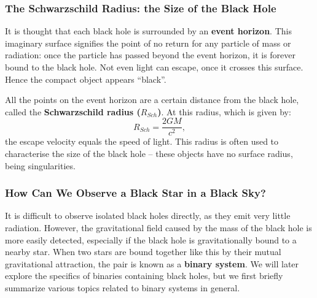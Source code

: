 
\subsubsection{The Schwarzschild Radius: the Size of the Black Hole}\label{cha:Introduction:sec:BlackHoles:subsubsec:EventHorizon}

It is thought that each black hole is surrounded by an \textbf{event
horizon}. This imaginary surface signifies the point of no return for any particle of mass
or radiation: once the particle has passed beyond the event horizon,
it is forever bound to the black hole. Not even light can escape, once it crosses this surface. Hence the compact object appears ``black''. %

\vspace{\myparskip}

All the points on the event horizon are a certain distance from the black hole, called the
\textbf{Schwarzschild radius ($R_{Sch}$)}. %
At this radius, which is given by:
\begin{equation}\label{cha:Introduction:sec:BlackHoles:eqn:R_Sch}
R_{Sch} = \frac{2 G M}{c^2},
\end{equation}
the escape velocity equals the speed of light. This radius is often used to characterise the size of the black hole -- these objects have no surface radius, being singularities. %


\subsubsection{How Can We Observe a Black Star in a Black Sky?}\label{cha:Introduction:sec:BlackHoles:subsubsec:HowCanWeObserveABlackStarInABlackSky}

It is difficult to observe isolated black holes directly, as they emit
very little radiation. However, the gravitational field caused by the mass of
the black hole is more easily detected, especially if the black hole
is gravitationally bound to a nearby star. When two stars are bound
together like this by their mutual gravitational attraction, the pair is known
as a \textbf{binary system}. We will later explore the specifics of
binaries containing black holes, but we first briefly summarize various topics
related to binary systems in general. %

